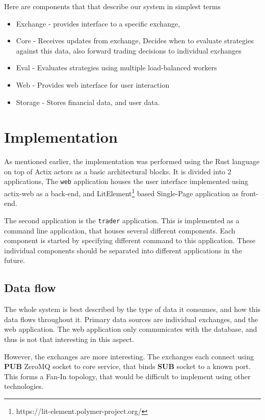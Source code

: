 \documentclass{ExcelAtFIT}
\begin{document}
    Here are components that that describe our system in simplest terms
    \begin{itemize}
        \item Exchange - provides interface to a specific exchange,
        \item Core - Receives updates from exchange, Decides when to evaluate strategies against this data, also forward
        trading decisions to individual exchanges
        \item Eval - Evaluates strategies using multiple load-balanced workers
        \item Web - Provides web interface for user interaction
        \item Storage - Stores financial data, and user data.
    \end{itemize}


    \section{Implementation}
    As mentioned earlier, the implementation was performed using the Rust language on top of Actix actors as a basic architectural blocks.
    It is divided into 2 applications, The \verb|web| application houses the user interface implemented using actix-web as a back-end,
    and LitElement\footnote{https://lit-element.polymer-project.org/} based Single-Page application as front-end.

    The second application is the \verb|trader| application. This is implemented as a command line application, that houses several
    different components. Each component is started by specifying different command to this application. These individual components should
    be separated into different applications in the future.

    \subsection{Data flow}
    The whole system is best described by the type of data it consumes, and how this data flows throughout it. Primary data sources
    are individual exchanges, and the web application. The web application only communicates with the database, and thus is not that
    interesting in this aspect.

    However, the exchanges are more interesting. The exchanges each connect using \textbf{PUB} ZeroMQ socket to core service,
    that binds \textbf{SUB} socket to a known port. This forms a Fan-In topology, that would be difficult to implement using other technologies.
\end{document}
